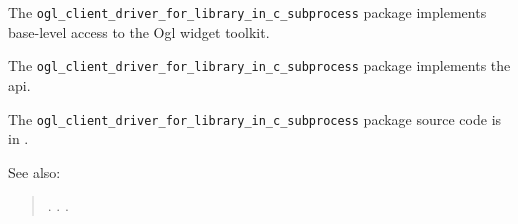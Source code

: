 
The {\tt ogl\_client\_driver\_for\_library\_in\_c\_subprocess} package implements base-level access to the Ogl widget 
toolkit.

The {\tt ogl\_client\_driver\_for\_library\_in\_c\_subprocess} package implements the  api.

The {\tt ogl\_client\_driver\_for\_library\_in\_c\_subprocess} package source code is in .

See also: 
\begin{quotation} 
.\newline 
{}.\newline 
{}.\newline 
\end{quotation} 


